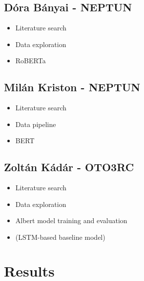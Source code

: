 \documentclass[runningheads]{llncs}
\begin{document}
\subsection{Dóra Bányai - NEPTUN}

\begin{itemize}
  \item Literature search
  \item Data exploration
  \item RoBERTa
\end{itemize}

\subsection{Milán Kriston - NEPTUN}

\begin{itemize}
  \item Literature search
  \item Data pipeline
  \item BERT
\end{itemize}

\subsection{Zoltán Kádár - OTO3RC}

\begin{itemize}
  \item Literature search
  \item Data exploration
  \item Albert model training and evaluation
  \item (LSTM-based baseline model)
\end{itemize}

\section{Results}
\end{document}
